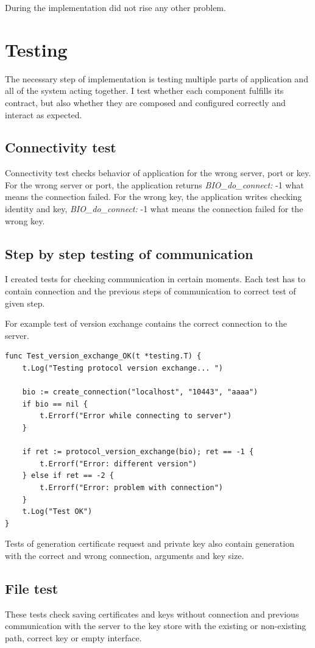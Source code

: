 \documentclass[
  digital, %
  notable,   %
  lof,     %
  lot,     %
]{fithesis3}
\begin{document}
During the implementation did not rise any other problem.

\section{Testing}

The necessary step of implementation is testing multiple parts of application and all of the 
system acting together. I test whether each component fulfills its contract, but also whether they 
are composed and configured correctly and interact as expected. 

\subsection{Connectivity test}

Connectivity test checks behavior of application for the wrong server, port or key. For the wrong 
server or port, the application returns \textit{BIO\_do\_connect:} -1 what means the connection 
failed. For the wrong key, the application writes checking identity and key, 
\textit{BIO\_do\_connect:} -1 what means the connection failed for the wrong key.

\subsection{Step by step testing of communication}
I created tests for checking communication in certain moments. Each test has to contain connection 
and the previous steps of communication to correct test of given step.

For example test of version exchange contains the correct connection to the server.
\begin{lstlisting}
func Test_version_exchange_OK(t *testing.T) {
	t.Log("Testing protocol version exchange... ")
		
	bio := create_connection("localhost", "10443", "aaaa")
	if bio == nil {
		t.Errorf("Error while connecting to server")
	}
	
	if ret := protocol_version_exchange(bio); ret == -1 {
		t.Errorf("Error: different version")
	} else if ret == -2 {
		t.Errorf("Error: problem with connection")
	} 
	t.Log("Test OK")
}
\end{lstlisting}

Tests of generation certificate request and private key also contain generation with the correct 
and wrong connection, arguments and key size.

\subsection{File test}
These tests check saving certificates and keys without connection and previous communication with 
the server to the key store with the existing or non-existing path, correct key or empty interface. 
\end{document}
